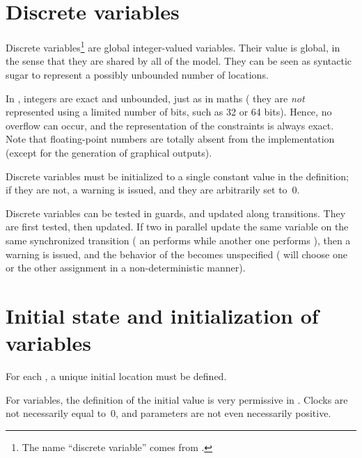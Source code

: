 \section{Discrete variables}\label{section:discrete}

Discrete variables\footnote{%
	The name ``discrete variable'' comes from \hytech{}.
}
are global integer-valued variables.
Their value is global, in the sense that they are shared by all \IPTA{} of the model.
They can be seen as syntactic sugar to represent a possibly unbounded number of locations.

In \imitator{}, integers are exact and unbounded, just as in maths (\ie{} they are \emph{not} represented using a limited number of bits, such as 32 or 64 bits).
Hence, no overflow can occur, and the representation of the constraints is always exact.
Note that floating-point numbers are totally absent from the \imitator{} implementation (except for the generation of graphical outputs).

Discrete variables must be initialized to a single constant value in the  definition;
if they are not, a warning is issued, and they are arbitrarily set to~0.

Discrete variables can be tested in guards, and updated along transitions.
They are first tested, then updated.
If two \IPTA{} in parallel update the same variable on the same synchronized transition (\eg{} an \IPTA{} performs  while another one performs ), then a warning is issued, and the behavior of the \NIPTA{} becomes unspecified (\ie{} \imitator{} will choose one or the other assignment in a non-deterministic manner).



\section{Initial state and initialization of variables}\label{section:init}

For each \IPTA{}, a unique initial location must be defined.

For variables, the definition of the initial value is very permissive in \imitator{}.
Clocks are not necessarily equal to~0, and parameters are not even necessarily positive.

